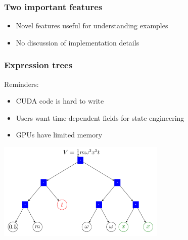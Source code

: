 \documentclass{beamer}
\begin{document}
\begin{frame}
\frametitle{Two important features}

\begin{itemize}
\item Novel features useful for understanding examples
\item No discussion of implementation details
\end{itemize}
\end{frame}

\begin{frame}
\frametitle{Expression trees}
Reminders:
\begin{itemize}
\item CUDA code is hard to write
\item Users want time-dependent fields for state engineering
\item GPUs have limited memory
\end{itemize}

\pause
\center \includegraphics[width=0.6\textwidth]{expr_tree.png}
\end{frame}
\end{document}
